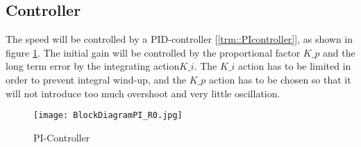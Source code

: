 \subsection{Controller}
\label{sec::controller}
The speed will be controlled by a PID-controller [\ref{trm::PIcontroller}], as shown in figure \ref{fig::picontrol}.
The initial gain will be controlled by the proportional factor $K\_ p$ and the long term error by the integrating action$K\_ i$. The $K\_ i$ action has to be limited in order to prevent integral wind-up, and the $K\_ p$ action has to be chosen so that it will not introduce too much overshoot and very little oscillation.

\begin{figure}[H]
\centering
\texttt{[image: BlockDiagramPI\_R0.jpg]}
\caption{PI-Controller}
\label{fig::picontrol}
\end{figure}

\newpage
